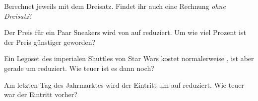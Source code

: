 \documentclass[10pt, a5paper, landscape]{arbeitsblatt}
\begin{document}
\TITEL

Berechnet jeweils mit dem Dreisatz. Findet ihr auch eine Rechnung \emph{ohne Dreisatz}?

\begin{aufgabe}[subtitle=Räume: 1 | 4 | 7]
	\label{aufg:prozentsatz}
	Der Preis für ein Paar Sneakers wird von  auf  reduziert. Um wie viel Prozent ist der Preis günstiger geworden?
\end{aufgabe}

\begin{aufgabe}[subtitle=Räume: 2 | 5 | 8]
	\label{aufg:prozentwert}
	Ein Legoset des imperialen Shuttles von Star Wars kostet normalerweise , ist aber gerade um  reduziert. Wie teuer ist es dann noch?
\end{aufgabe}

\begin{aufgabe}[subtitle=Räume: 3 | 6 | 9]
	\label{aufg:grundwert}
	Am letzten Tag des Jahrmarktes wird der Eintritt um  auf  reduziert. Wie teuer war der Eintritt vorher?
\end{aufgabe}
\end{document}

